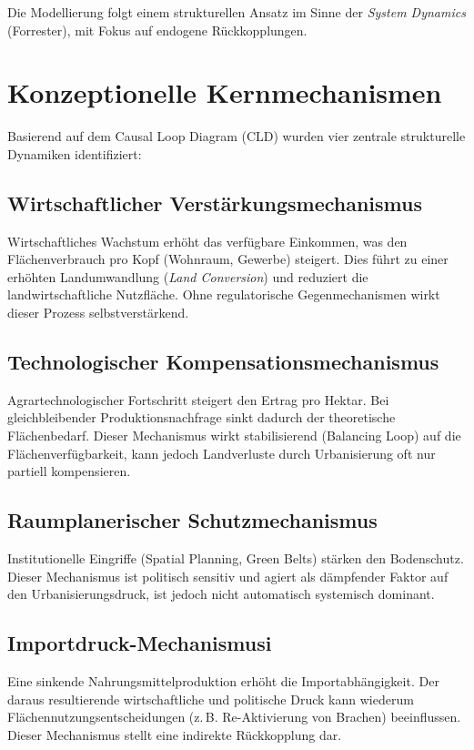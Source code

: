 \documentclass[11pt, a4paper, oneside]{scrartcl}
\begin{document}
Die Modellierung folgt einem strukturellen Ansatz im Sinne der \textit{System Dynamics} (Forrester), mit Fokus auf endogene Rückkopplungen.

\section{Konzeptionelle Kernmechanismen}
Basierend auf dem Causal Loop Diagram (CLD) wurden vier zentrale strukturelle Dynamiken identifiziert:

\subsection{Wirtschaftlicher Verstärkungsmechanismus}
Wirtschaftliches Wachstum erhöht das verfügbare Einkommen, was den Flächenverbrauch pro Kopf (Wohnraum, Gewerbe) steigert. Dies führt zu einer erhöhten Landumwandlung (\textit{Land Conversion}) und reduziert die landwirtschaftliche Nutzfläche.
Ohne regulatorische Gegenmechanismen wirkt dieser Prozess selbstverstärkend.

\subsection{Technologischer Kompensationsmechanismus}
Agrartechnologischer Fortschritt steigert den Ertrag pro Hektar. Bei gleichbleibender Produktionsnachfrage sinkt dadurch der theoretische Flächenbedarf. 
Dieser Mechanismus wirkt stabilisierend (Balancing Loop) auf die Flächenverfügbarkeit, kann jedoch Landverluste durch Urbanisierung oft nur partiell kompensieren.

\subsection{Raumplanerischer Schutzmechanismus}
Institutionelle Eingriffe (Spatial Planning, Green Belts) stärken den Bodenschutz. Dieser Mechanismus ist politisch sensitiv und agiert als dämpfender Faktor auf den Urbanisierungsdruck, 
ist jedoch nicht automatisch systemisch dominant.

\subsection{Importdruck-Mechanismusi}
Eine sinkende Nahrungsmittelproduktion erhöht die Importabhängigkeit. 
Der daraus resultierende wirtschaftliche und politische Druck kann wiederum Flächennutzungsentscheidungen (z.\,B. Re-Aktivierung von Brachen) beeinflussen.
Dieser Mechanismus stellt eine indirekte Rückkopplung dar.
\end{document}
